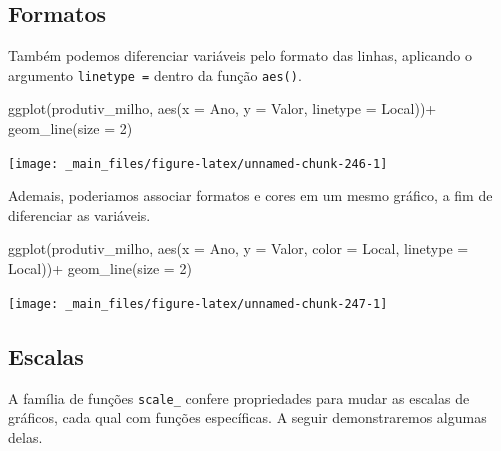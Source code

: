 \documentclass[
  brazilian,
]{book}
\newenvironment{Shaded}{\begin{snugshade}}{\end{snugshade}}
\newcommand{\AttributeTok}[1]{\textcolor[rgb]{0.77,0.63,0.00}{#1}}
\newcommand{\DecValTok}[1]{\textcolor[rgb]{0.00,0.00,0.81}{#1}}
\newcommand{\FunctionTok}[1]{\textcolor[rgb]{0.00,0.00,0.00}{#1}}
\newcommand{\NormalTok}[1]{#1}
\newcommand{\SpecialCharTok}[1]{\textcolor[rgb]{0.00,0.00,0.00}{#1}}
\begin{document}
\hypertarget{formatos-1}{%
\subsection{Formatos}\label{formatos-1}}

Também podemos diferenciar variáveis pelo formato das linhas, aplicando o argumento \texttt{linetype\ =} dentro da função \texttt{aes()}.

\begin{Shaded}
\begin{Highlighting}[]
\FunctionTok{ggplot}\NormalTok{(produtiv\_milho, }
       \FunctionTok{aes}\NormalTok{(}\AttributeTok{x =}\NormalTok{ Ano,}
           \AttributeTok{y =}\NormalTok{ Valor,}
           \AttributeTok{linetype =}\NormalTok{ Local))}\SpecialCharTok{+}
  \FunctionTok{geom\_line}\NormalTok{(}\AttributeTok{size =} \DecValTok{2}\NormalTok{)}
\end{Highlighting}
\end{Shaded}

\begin{center}\texttt{[image: \_main\_files/figure-latex/unnamed-chunk-246-1]} \end{center}

Ademais, poderiamos associar formatos e cores em um mesmo gráfico, a fim de diferenciar as variáveis.

\begin{Shaded}
\begin{Highlighting}[]
\FunctionTok{ggplot}\NormalTok{(produtiv\_milho, }
       \FunctionTok{aes}\NormalTok{(}\AttributeTok{x =}\NormalTok{ Ano,}
           \AttributeTok{y =}\NormalTok{ Valor,}
           \AttributeTok{color =}\NormalTok{ Local,}
           \AttributeTok{linetype =}\NormalTok{ Local))}\SpecialCharTok{+}
  \FunctionTok{geom\_line}\NormalTok{(}\AttributeTok{size =} \DecValTok{2}\NormalTok{)}
\end{Highlighting}
\end{Shaded}

\begin{center}\texttt{[image: \_main\_files/figure-latex/unnamed-chunk-247-1]} \end{center}

\hypertarget{escalas}{%
\subsection{Escalas}\label{escalas}}

A família de funções \texttt{scale\_} confere propriedades para mudar as escalas de gráficos, cada qual com funções específicas. A seguir demonstraremos algumas delas.
\end{document}
